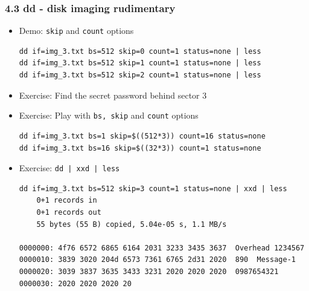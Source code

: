 \begin{frame}[fragile]
  \frametitle{4.3 dd - disk imaging rudimentary}
    \begin{itemize}
        \item[] Demo: \texttt{skip} and \texttt{count} options
\begin{lstlisting}[basicstyle=\tiny]
dd if=img_3.txt bs=512 skip=0 count=1 status=none | less
dd if=img_3.txt bs=512 skip=1 count=1 status=none | less
dd if=img_3.txt bs=512 skip=2 count=1 status=none | less
\end{lstlisting}
        \item[] Exercise: Find the secret password behind sector 3
        \item[] Exercise: Play with \texttt{bs, skip} and \texttt{count} options
\begin{lstlisting}[basicstyle=\tiny]
dd if=img_3.txt bs=1 skip=$((512*3)) count=16 status=none
dd if=img_3.txt bs=16 skip=$((32*3)) count=1 status=none
\end{lstlisting}
        \item[] Exercise: \texttt{dd | xxd | less}
\begin{lstlisting}[basicstyle=\tiny]
dd if=img_3.txt bs=512 skip=3 count=1 status=none | xxd | less
	0+1 records in
	0+1 records out
	55 bytes (55 B) copied, 5.04e-05 s, 1.1 MB/s

0000000: 4f76 6572 6865 6164 2031 3233 3435 3637  Overhead 1234567
0000010: 3839 3020 204d 6573 7361 6765 2d31 2020  890  Message-1  
0000020: 3039 3837 3635 3433 3231 2020 2020 2020  0987654321      
0000030: 2020 2020 2020 20
\end{lstlisting}
    \end{itemize}
\end{frame}


